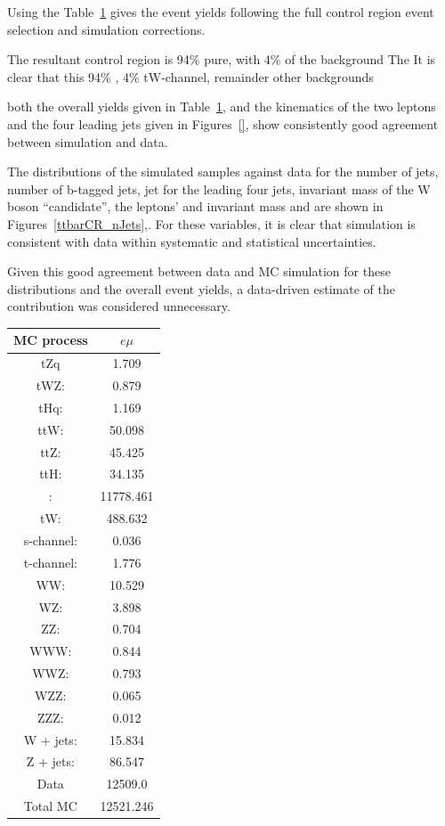 Using the 
Table~\ref{tab:ttbarCR} gives the event yields following the full \ttbar control region event selection and simulation corrections.
 
The resultant control region is 94\% pure, with 4\% of the background 
The
It is clear that this 
94\% \ttbar, 4\% tW-channel, remainder other backgrounds

both the overall yields given in Table~\ref{tab:ttbarCR}, and the kinematics of the two leptons and the four leading jets given in Figures~\ref{}, show consistently good agreement between simulation and data.

The distributions of the simulated samples against data for the number of jets, number of b-tagged jets, jet \pT for the leading four jets, invariant mass of the W boson ``candidate'', the leptons' \pt and invariant mass and \pt  are shown in Figures~\ref{ttbarCR_nJets},.
For these variables, it is clear that simulation is consistent with data within systematic and statistical uncertainties.

Given this good agreement between data and MC simulation for these distributions and the overall event yields, a data-driven estimate of the \ttbar contribution was considered unnecessary.

\begin{table}[htbp]
\label{tab:ttbarCR}
  \centering
 \begin{tabular}{cc}
   \hline
   \textbf{MC process} & \textbf{$e\mu$}  \\
   \hline
	tZq & 1.709  \\
	tWZ\@: & 0.879  \\
	tHq: & 1.169  \\
	ttW\@: & 50.098   \\
	ttZ\@: & 45.425   \\
	ttH\@: & 34.135  \\
	\ttbar: & 11778.461   \\
	tW\@: & 488.632    \\
	s-channel: &  0.036 \\
	t-channel: & 1.776 \\
	WW\@: & 10.529  \\
	WZ\@: & 3.898 \\
	ZZ\@: & 0.704 \\
	WWW\@: & 0.844     \\
	WWZ\@: & 0.793     \\
	WZZ\@: & 0.065     \\
	ZZZ\@: & 0.012     \\
	W + jets: & 15.834     \\
	Z + jets: & 86.547     \\
	\hline
	Data & 12509.0    \\
	Total MC & 12521.246     \\
   \hline
 \end{tabular}
\end{table}

